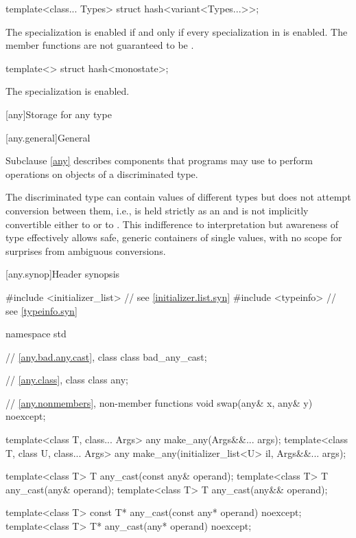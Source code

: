 %
\begin{itemdecl}
template<class... Types> struct hash<variant<Types...>>;
\end{itemdecl}

\begin{itemdescr}
\pnum
The specialization  is enabled
if and only if every specialization in  is enabled.
The member functions are not guaranteed to be .
\end{itemdescr}

%
\begin{itemdecl}
template<> struct hash<monostate>;
\end{itemdecl}

\begin{itemdescr}
\pnum
The specialization is enabled.
\end{itemdescr}


[any]{Storage for any type}

[any.general]{General}

\pnum
Subclause \ref{any} describes components that \Cpp{} programs may use to perform operations on objects of a discriminated type.

\pnum
\begin{note}
The discriminated type can contain values of different types but does not attempt conversion between them,
i.e.,  is held strictly as an  and is not implicitly convertible either to  or to .
This indifference to interpretation but awareness of type effectively allows safe, generic containers of single values, with no scope for surprises from ambiguous conversions.
\end{note}

[any.synop]{Header  synopsis}

%

\begin{codeblock}
#include <initializer_list>     // see \ref{initializer.list.syn}
#include <typeinfo>             // see \ref{typeinfo.syn}

namespace std {
  // \ref{any.bad.any.cast}, class 
  class bad_any_cast;

  // \ref{any.class}, class 
  class any;

  // \ref{any.nonmembers}, non-member functions
  void swap(any& x, any& y) noexcept;

  template<class T, class... Args>
    any make_any(Args&&... args);
  template<class T, class U, class... Args>
    any make_any(initializer_list<U> il, Args&&... args);

  template<class T>
    T any_cast(const any& operand);
  template<class T>
    T any_cast(any& operand);
  template<class T>
    T any_cast(any&& operand);

  template<class T>
    const T* any_cast(const any* operand) noexcept;
  template<class T>
    T* any_cast(any* operand) noexcept;
}
\end{codeblock}

